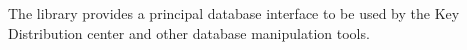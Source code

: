 The  library provides a principal database interface
to be used by the Key Distribution center and other database
manipulation tools.
